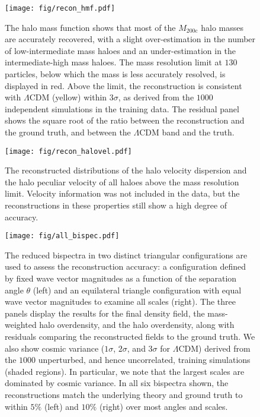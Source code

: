 \begin{figure}
    \centering
    \texttt{[image: fig/recon\_hmf.pdf]}
    \vspace{-1em}
    \caption{The halo mass function shows that most of the $M_{200\mathrm{c}}$ halo masses are accurately recovered, with a slight over-estimation in the number of low-intermediate mass haloes and an under-estimation in the intermediate-high mass haloes. The mass resolution limit at $130$ particles, below which the mass is less accurately resolved, is displayed in red. Above the limit, the reconstruction is consistent with $\Lambda$CDM (yellow) within $3\sigma$, as derived from the $1000$ independent simulations in the training data. The residual panel shows the square root of the ratio between the reconstruction and the ground truth, and between the $\Lambda$CDM band and the truth.}
    \label{fig:reconstruction_hmf}
\end{figure}

\begin{figure}
    \centering
    \texttt{[image: fig/recon\_halovel.pdf]}
    \caption{The reconstructed distributions of the halo velocity dispersion and the halo peculiar velocity of all haloes above the mass resolution limit. Velocity information was not included in the data, but the reconstructions in these properties still show a high degree of accuracy.}
    \label{fig:halo_vel}
\end{figure}

\begin{figure*}
    \centering
    \texttt{[image: fig/all\_bispec.pdf]}
    \vspace{-1em}
    \caption{The reduced bispectra in two distinct triangular configurations are used to assess the reconstruction accuracy: a configuration defined by fixed wave vector magnitudes as a function of the separation angle $\theta$ (left) and an equilateral triangle configuration with equal wave vector magnitudes to examine all scales (right). The three panels display the results for the final density field, the mass-weighted halo overdensity, and the halo overdensity, along with residuals comparing the reconstructed fields to the ground truth. We also show cosmic variance ($1\sigma$, $2\sigma$, and $3\sigma$ for $\Lambda$CDM) derived from the $1000$ unperturbed, and hence uncorrelated, training simulations (shaded regions). In particular, we note that the largest scales are dominated by cosmic variance. In all six bispectra shown, the reconstructions match the underlying theory and ground truth to within $5\%$ (left) and $10\%$ (right) over most angles and scales.}
    \label{fig:recon_bispec}
\end{figure*}

